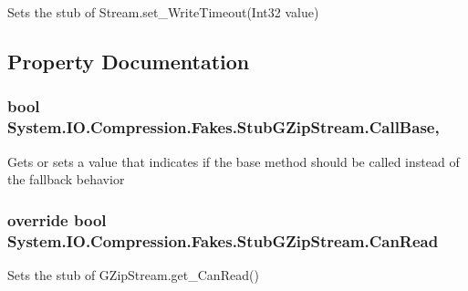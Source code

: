 Sets the stub of Stream.\-set\-\_\-\-Write\-Timeout(\-Int32 value)



\subsection{Property Documentation}
\hypertarget{class_system_1_1_i_o_1_1_compression_1_1_fakes_1_1_stub_g_zip_stream_a335bd28c42a57b916e074fc614e5319f}{
\subsubsection[{Call\-Base}]{\setlength{\rightskip}{0pt plus 5cm}bool System.\-I\-O.\-Compression.\-Fakes.\-Stub\-G\-Zip\-Stream.\-Call\-Base\hspace{0.3cm}{\ttfamily [get]}, {\ttfamily [set]}}}\label{class_system_1_1_i_o_1_1_compression_1_1_fakes_1_1_stub_g_zip_stream_a335bd28c42a57b916e074fc614e5319f}


Gets or sets a value that indicates if the base method should be called instead of the fallback behavior

\hypertarget{class_system_1_1_i_o_1_1_compression_1_1_fakes_1_1_stub_g_zip_stream_abaf7b67d4d95ece3b0cddc85d918a1e1}{
\subsubsection[{Can\-Read}]{\setlength{\rightskip}{0pt plus 5cm}override bool System.\-I\-O.\-Compression.\-Fakes.\-Stub\-G\-Zip\-Stream.\-Can\-Read\hspace{0.3cm}{\ttfamily [get]}}}\label{class_system_1_1_i_o_1_1_compression_1_1_fakes_1_1_stub_g_zip_stream_abaf7b67d4d95ece3b0cddc85d918a1e1}


Sets the stub of G\-Zip\-Stream.\-get\-\_\-\-Can\-Read()

